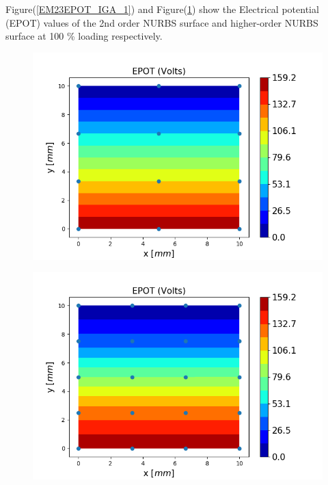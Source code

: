 \documentclass[12pt]{article}
\begin{document}
Figure(\ref{EM23EPOT_IGA_1}) and Figure(\ref{HEM12EPOT_IGA}) show the Electrical potential (EPOT) values of the 2nd order NURBS surface and higher-order NURBS surface at 100 \% loading respectively. \\
\begin{figure}[H]
	\centering
	\begin{minipage}{.5\textwidth}
		\centering
		\includegraphics[width=1\linewidth]{EM23EPOT_IGA.png}
		\label{EM23EPOT_IGA_1}
	\end{minipage}%
	\begin{minipage}{.5\textwidth}
		\centering
		\includegraphics[width=1\linewidth]{HEM12EPOT_IGA.png}
		\label{HEM12EPOT_IGA}
	\end{minipage}
\end{figure}
\end{document}
